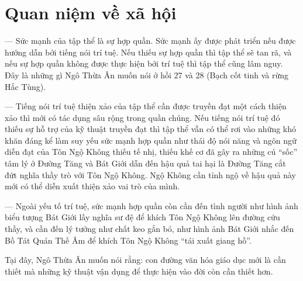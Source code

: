 \section{Quan niệm về xã hội} %
\label{sec:27_28_xa_hoi}

— Sức mạnh của tập thể là sự hợp quần. Sức mạnh ấy được phát triển nếu được hướng dẫn bởi tiếng nói trí tuệ. Nếu thiếu sự hợp quần thì tập thể sẽ tan rã, và nếu sự hợp quần không được thực hiện bởi trí tuệ thì tập thể cũng lâm nguy. Đây là những gì Ngô Thừa Ân muốn nói ở hồi 27 và 28 (Bạch cốt tinh và rừng Hắc Tùng).

— Tiếng nói trí tuệ thiện xảo của tập thể cần được truyền đạt một cách thiện xảo thì mới có tác dụng sâu rộng trong quần chúng. Nếu tiếng nói trí tuệ đó thiếu sự hỗ trợ của kỹ thuật truyền đạt thì tập thể vẫn có thể rơi vào những khó khăn đáng kể làm suy yếu sức mạnh hợp quần như thái độ nói năng và ngôn ngữ diễn đạt của Tôn Ngộ Không thiếu tế nhị, thiếu khế cơ đã gây ra những cú ``sốc'' tâm lý ở Đường Tăng và Bát Giới dẫn đến hậu quả tai hại là Đường Tăng cắt đứt nghĩa thầy trò với Tôn Ngộ Không. Ngộ Không cần tỉnh ngộ về hậu quả này mới có thể diễn xuất thiện xảo vai trò của mình.

— Ngoài yếu tố trí tuệ, sức mạnh hợp quần còn cần đến tình người như hình ảnh biểu tượng Bát Giới lấy nghĩa sư đệ để khích Tôn Ngộ Không lên đường cứu thầy, và cần đến lý tưởng như chất keo gắn bó, như hình ảnh Bát Giới nhắc đến Bồ Tát Quán Thế Âm để khích Tôn Ngộ Không ``tái xuất giang hồ''.

Tại đây, Ngô Thừa Ân muốn nói rằng: con đường văn hóa giáo dục mới là cần thiết mà những kỹ thuật vận dụng để thực hiện vào đời còn cần thiết hơn.
